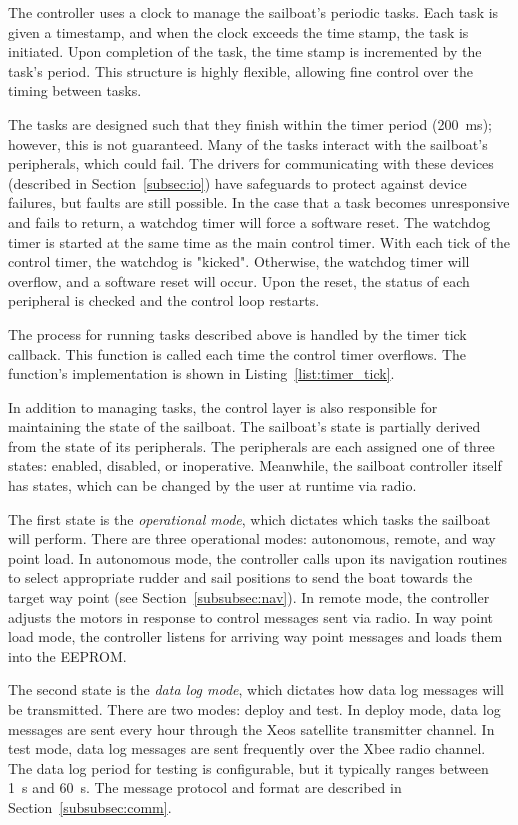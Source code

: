 \documentclass[12pt]{article}
\begin{document}
The controller uses a clock to manage the sailboat's periodic tasks. Each task is given a timestamp, and when the clock exceeds the time stamp, the task is initiated. Upon completion of the task, the time stamp is incremented by the task's period. This structure is highly flexible, allowing fine control over the timing between tasks. 

The tasks are designed such that they finish within the timer period (\SI{200}{\milli\second}); however, this is not guaranteed. Many of the tasks interact with the sailboat's peripherals, which could fail. The drivers for communicating with these devices (described in Section~\ref{subsec:io}) have safeguards to protect against device failures, but faults are still possible. In the case that a task becomes unresponsive and fails to return, a watchdog timer will force a software reset. The watchdog timer is started at the same time as the main control timer. With each tick of the control timer, the watchdog is "kicked". Otherwise, the watchdog timer will overflow, and a software reset will occur. Upon the reset, the status of each peripheral is checked and the control loop restarts.

The process for running tasks described above is handled by the timer tick callback. This function is called each time the control timer overflows. The function's implementation is shown in Listing~\ref{list:timer_tick}.

In addition to managing tasks, the control layer is also responsible for maintaining the state of the sailboat. The sailboat's state is partially derived from the state of its peripherals. The peripherals are each assigned one of three states: enabled, disabled, or inoperative. Meanwhile, the sailboat controller itself has states, which can be changed by the user at runtime via radio. 

The first state is the \textit{operational mode}, which dictates which tasks the sailboat will perform. There are three operational modes: autonomous, remote, and way point load. In autonomous mode, the controller calls upon its navigation routines to select appropriate rudder and sail positions to send the boat towards the target way point (see Section~\ref{subsubsec:nav}). In remote mode, the controller adjusts the motors in response to control messages sent via radio. In way point load mode, the controller listens for arriving way point messages and loads them into the EEPROM.

The second state is the \textit{data log mode}, which dictates how data log messages will be transmitted. There are two modes: deploy and test. In deploy mode, data log messages are sent every hour through the Xeos satellite transmitter channel. In test mode, data log messages are sent frequently over the Xbee radio channel. The data log period for testing is configurable, but it typically ranges between \SI{1}{\second} and \SI{60}{\second}. The message protocol and format are described in Section~\ref{subsubsec:comm}.
\end{document}
